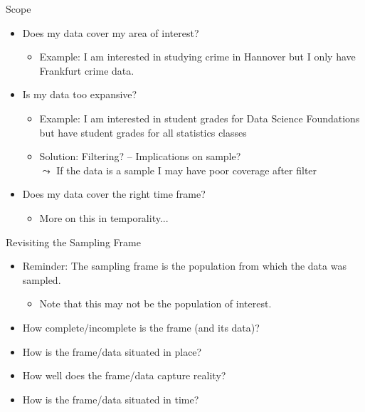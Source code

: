 \documentclass[aspectratio=169]{../latex_main/tntbeamer}  %
\begin{document}
\begin{frame}[c]{Scope}
    \begin{itemize}
        \item  Does my data cover my area of interest?
        \begin{itemize}
            \item Example: I am interested in studying crime in Hannover but I only have Frankfurt crime data.
        \end{itemize}
        \pause
        \item  Is my data too expansive?
        \begin{itemize}
            \item Example: I am interested in student grades for Data Science Foundations but have student grades for all statistics classes
            \item Solution: Filtering? -- Implications on sample?\\
            $\leadsto$ If the data is a sample I may have poor coverage after filter
        \end{itemize}
        \pause
        \item Does my data cover the right time frame?
        \begin{itemize}
            \item  More on this in temporality...
        \end{itemize}
    \end{itemize}

\end{frame}


\begin{frame}[c]{Revisiting the Sampling Frame}
    \begin{itemize}
        \item \alert{Reminder:} The sampling frame is the population from which the data was sampled.
        \begin{itemize}
            \item Note that this may not be the population of interest.
        \end{itemize}
        \item How complete/incomplete is the frame (and its data)?
        \item How is the frame/data situated in place?
        \item How well does the frame/data capture reality?
        \item How is the frame/data situated in time?
    \end{itemize}
\end{frame}
\end{document}
